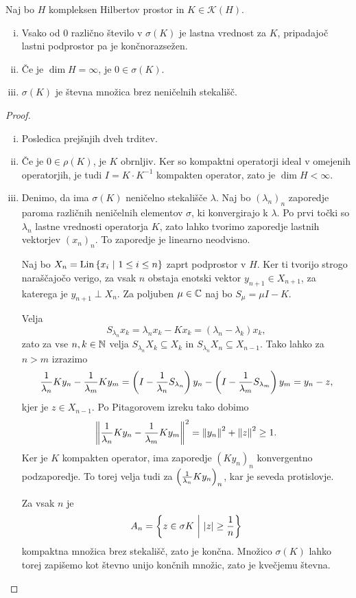 
\begin{izrek}
Naj bo $H$ kompleksen Hilbertov prostor in $K \in \mathcal{K}(H)$.

\begin{enumerate}[i)]
\item Vsako od $0$ različno število v $\sigma(K)$ je lastna
vrednost za $K$, pripadajoč lastni podprostor pa je končnorazsežen.
\item Če je $\dim H = \infty$, je $0 \in \sigma(K)$.
\item $\sigma(K)$ je števna množica brez neničelnih stekališč.
\end{enumerate}
\end{izrek}

\begin{proof}
\phantom{a}
\begin{enumerate}[i)]
\item Posledica prejšnjih dveh trditev.
\item Če je $0 \in \rho(K)$, je $K$ obrnljiv. Ker so kompaktni
operatorji ideal v omejenih operatorjih, je tudi
$I = K \cdot K^{-1}$ kompakten operator, zato je $\dim H < \infty$.
\item Denimo, da ima $\sigma(K)$ neničelno stekališče $\lambda$.
Naj bo $(\lambda_n)_n$ zaporedje paroma različnih neničelnih
elementov $\sigma$, ki konvergirajo k $\lambda$. Po prvi točki so
$\lambda_n$ lastne vrednosti operatorja $K$, zato lahko tvorimo
zaporedje lastnih vektorjev $(x_n)_n$. To zaporedje je linearno
neodvisno.

Naj bo $X_n = \operatorname{Lin} \left\{x_i~\middle\vert~1 \leq i \leq n\right\}$ zaprt podprostor v
$H$. Ker ti tvorijo strogo naraščajočo verigo, za vsak $n$ obstaja
enotski vektor $y_{n+1} \in X_{n+1}$, za katerega je
$y_{n+1} \perp X_n$. Za poljuben $\mu \in \mathbb{C}$ naj bo
$S_\mu = \mu I - K$.

Velja
\[
S_{\lambda_n} x_k =
\lambda_n x_k - Kx_k =
(\lambda_n - \lambda_k) x_k,
\]
zato za vse $n, k \in \mathbb{N}$ velja $S_{\lambda_n} X_k \subseteq X_k$
in $S_{\lambda_n} X_n \subseteq X_{n-1}$. Tako lahko za $n > m$
izrazimo
\[
\frac{1}{\lambda_n} K y_n - \frac{1}{\lambda_m} K y_m =
\left(I - \frac{1}{\lambda_n} S_{\lambda_n}\right) y_n -
\left(I - \frac{1}{\lambda_m} S_{\lambda_m}\right) y_m =
y_n - z,
\]
kjer je $z \in X_{n-1}$. Po Pitagorovem izreku tako dobimo
\[
\left\lVert \frac{1}{\lambda_n} K y_n - \frac{1}{\lambda_m} K y_m\right\rVert^2 =
\left\lVert y_n\right\rVert^2 + \left\lVert z\right\rVert^2 \geq
1.
\]
Ker je $K$ kompakten operator, ima zaporedje $(K y_n)_n$
konvergentno podzaporedje. To torej velja tudi za
$\left(\frac{1}{\lambda_n} K y_n\right)_n$, kar je seveda protislovje.

Za vsak $n$ je
\[
A_n = \left\{z \in \sigma{K}~\middle\vert~\left\lvert z\right\rvert \geq \frac{1}{n}\right\}
\]
kompaktna množica brez stekališč, zato je končna. Množico
$\sigma(K)$ lahko torej zapišemo kot števno unijo končnih množic,
zato je kvečjemu števna. \qedhere
\end{enumerate}
\end{proof}

